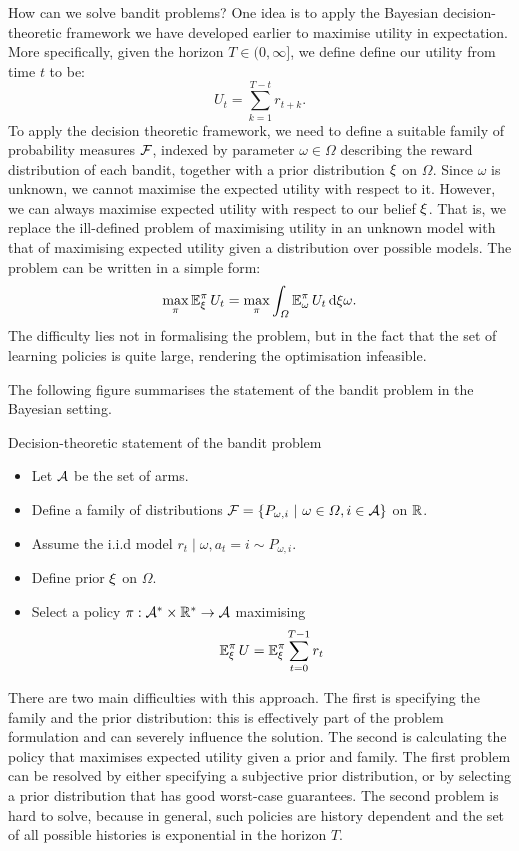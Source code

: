 How can we solve bandit problems? One idea is to apply the Bayesian
decision-theoretic framework we have developed earlier to maximise
utility in expectation.  More specifically, given the horizon $T
\in (0, \infty]$, we define
define our utility from time $t$ to be:
\begin{equation}
  \label{eq:reward-utility}
  U_t = \sum_{k=1}^{T-t} r_{t+k}.
\end{equation}
To apply the decision theoretic framework, we need to define a suitable family of probability measures $\mathcal{F}$, indexed by parameter $\omega \in \Omega$ describing the reward distribution of each bandit, together with a prior distribution $\xi$ on $\Omega$. Since $\omega$ is unknown, we cannot maximise the expected utility with respect to it. However, we can always maximise expected utility with respect to our belief $\xi$. That is, we replace the ill-defined problem of maximising utility in an unknown model with that of maximising expected utility given a distribution over possible models. The problem can be written in a simple form:
\begin{equation}
  \label{eq:bel-reward-utility}
  \max_\pi \mathop{\mbox{\ensuremath{\mathbb{E}}}}\nolimits_\xi^\pi U_t = 
  \max_\pi \int_\Omega \mathop{\mbox{\ensuremath{\mathbb{E}}}}\nolimits_\omega^\pi U_t \,\mathrm{d} \xi{\omega}.
\end{equation}
The difficulty lies not in formalising the problem, but in the fact that the set of learning policies is quite large, rendering the optimisation infeasible. 

The following figure summarises the statement of the bandit problem in the Bayesian setting.
\begin{block}{Decision-theoretic statement of the bandit problem}
  \begin{itemize}
  \item Let ${\mathcal{A}}$ be the set of arms.
  \item Define a family of distributions $\mathcal{F} = \left\{P_{\omega, i} ~\middle|~ \omega \in \Omega, i \in {\mathcal{A}}\right\}$ on ${\mathbb{R}}$.
  \item Assume the i.i.d model $r_t \mid \omega, a_t = i \sim P_{\omega, i}$.
  \item Define prior $\xi$ on $\Omega$.
  \item Select a policy $\pi : {\mathcal{A}}^* \times {\mathbb{R}}^* \to {\mathcal{A}}$ maximising
    \[
    \mathop{\mbox{\ensuremath{\mathbb{E}}}}\nolimits^\pi_\xi U = \mathop{\mbox{\ensuremath{\mathbb{E}}}}\nolimits^\pi_\xi \sum_{t=0}^{T - 1}  r_{t}
    \]
  \end{itemize}
\end{block}
There are two main difficulties with this approach. The first is specifying the family and the prior distribution: this is effectively part of the problem formulation and can severely influence the solution. The second is calculating the policy that maximises expected utility given a prior and family. The first problem can be resolved by either specifying a subjective prior distribution, or by selecting a prior distribution that has good worst-case guarantees. The second problem is hard to solve, because in general, such policies are history dependent and the set of all possible histories is exponential in the horizon $T$.

